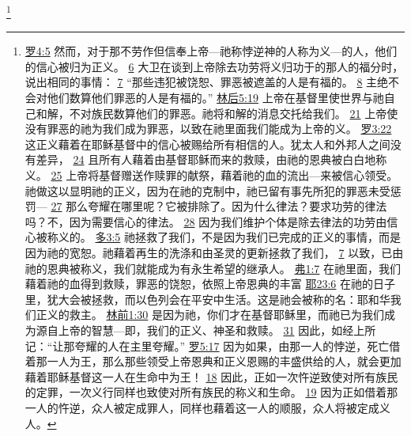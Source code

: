 \documentclass[12pt, a4paper, oneside]{ctexart}
\begin{document}
	\footnote {
		\href{https://biblehub.com/romans/4-5.htm}{罗4:5} 然而，对于那不劳作但信奉上帝---祂称悖逆神的人称为义---的人，他们的信心被归为正义。
		\href{https://biblehub.com/romans/4-6.htm}{6} 大卫在谈到上帝除去功劳将义归功于的那人的福分时，说出相同的事情：
		\href{https://biblehub.com/romans/4-7.htm}{7} “那些违犯被饶恕、罪恶被遮盖的人是有福的。
		\href{https://biblehub.com/romans/4-8.htm}{8} 主绝不会对他们数算他们罪恶的人是有福的。”
		\href{https://biblehub.com/2_corinthians/5-19.htm}{林后5:19} 上帝在基督里使世界与祂自己和解，不对族民数算他们的罪恶。祂将和解的消息交托给我们。
		\href{https://biblehub.com/2_corinthians/5-21.htm}{21} 上帝使没有罪恶的祂为我们成为罪恶，以致在祂里面我们能成为上帝的义。
		\href{https://biblehub.com/romans/3-22.htm}{罗3:22} 这正义藉着在耶稣基督中的信心被赐给所有相信的人。犹太人和外邦人之间没有差异，
		\href{https://biblehub.com/romans/3-24.htm}{24} 且所有人藉着由基督耶稣而来的救赎，由祂的恩典被白白地称义。
		\href{https://biblehub.com/romans/3-25.htm}{25} 上帝将基督赠送作赎罪的献祭，藉着祂的血的流出---来被信心领受。祂做这以显明祂的正义，因为在祂的克制中，祂已留有事先所犯的罪恶未受惩罚---
		\href{https://biblehub.com/romans/3-27.htm}{27} 那么夸耀在哪里呢？它被排除了。因为什么律法？要求功劳的律法吗？不，因为需要信心的律法。
		\href{https://biblehub.com/romans/3-28.htm}{28} 因为我们维护个体是除去律法的功劳由信心被称义的。
		\href{https://biblehub.com/titus/3-5.htm}{多3:5} 祂拯救了我们，不是因为我们已完成的正义的事情，而是因为祂的宽恕。祂藉着再生的洗涤和由圣灵的更新拯救了我们，
		\href{https://biblehub.com/titus/3-7.htm}{7} 以致，已由祂的恩典被称义，我们就能成为有永生希望的继承人。
        \href{https://biblehub.com/ephesians/1-7.htm}{弗1:7} 在祂里面，我们藉着祂的血得到救赎，罪恶的饶恕，依照上帝恩典的丰富
		\href{https://biblehub.com/jeremiah/23-6.htm}{耶23:6} 在祂的日子里，犹大会被拯救，而以色列会在平安中生活。这是祂会被称的名：耶和华我们正义的救主。
		\href{https://biblehub.com/1_corinthians/1-30.htm}{林前1:30} 是因为祂，你们才在基督耶稣里，而祂已为我们成为源自上帝的智慧---即，我们的正义、神圣和救赎。
		\href{https://biblehub.com/1_corinthians/1-31.htm}{31} 因此，如经上所记：“让那夸耀的人在主里夸耀。”
        \href{https://biblehub.com/romans/5-17.htm}{罗5:17} 因为如果，由那一人的悖逆，死亡借着那一人为王，那么那些领受上帝恩典和正义恩赐的丰盛供给的人，就会更加藉着耶稣基督这一人在生命中为王！
		\href{https://biblehub.com/romans/5-18.htm}{18} 因此，正如一次忤逆致使对所有族民的定罪，一次义行同样也致使对所有族民的称义和生命。
		\href{https://biblehub.com/romans/5-19.htm}{19} 因为正如借着那一人的忤逆，众人被定成罪人，同样也藉着这一人的顺服，众人将被定成义人。
	}
\end{document}
